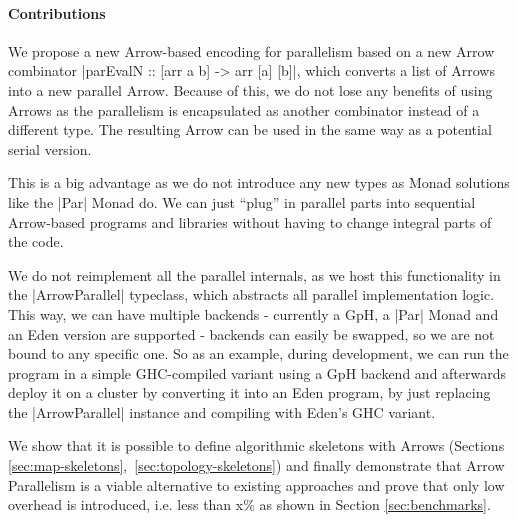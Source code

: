 \paragraph{Contributions}
%
%
We propose a new Arrow-based encoding for parallelism based on a new Arrow combinator |parEvalN :: [arr a b] -> arr [a] [b]|, which converts a list of Arrows into a new parallel Arrow. Because of this, we do not lose any benefits of using Arrows as the parallelism is encapsulated as another combinator instead of a different type. The resulting Arrow can be used in the same way as a potential serial version.

This is a big advantage as we do not introduce any new types as Monad solutions like the |Par| Monad do. We can just \enquote{plug} in parallel parts into sequential Arrow-based programs and libraries without having to change integral parts of the code. 


We do not reimplement all the parallel internals, as we host this functionality in the |ArrowParallel| typeclass, which abstracts all parallel implementation logic. This way, we can have multiple backends - currently a GpH, a |Par| Monad and an Eden version are supported - backends can easily be swapped, so we are not bound to any specific one. So as an example, during development, we can run the program in a simple GHC-compiled variant using a GpH backend and afterwards deploy it on a cluster by converting it into an Eden program, by just replacing the |ArrowParallel| instance and compiling with Eden's GHC variant.

We show that it is possible to define algorithmic skeletons with Arrows (Sections \ref{sec:map-skeletons},~\ref{sec:topology-skeletons}) and finally demonstrate that Arrow Parallelism is a viable alternative to existing approaches and prove that only low overhead is introduced, i.e. less than x\%  as shown in Section \ref{sec:benchmarks}.



